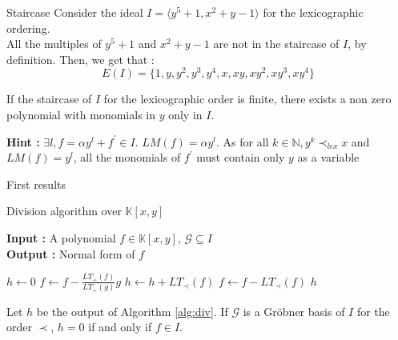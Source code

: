 \documentclass{beamer}
\begin{document}
\begin{frame}{Staircase}
    Consider the ideal $I = \langle y^{5} + 1, x^2 + y - 1 \rangle$ for the lexicographic ordering. \\
    All the multiples of $y^{5} + 1$ and $x^2 + y - 1$ are not in the staircase of $I$, by definition. 
    Then, we get that : 
    \begin{displaymath}
        E(I) = \{ 1, y, y^{2}, y^{3}, y^{4}, x, xy, xy^{2}, xy^{3}, xy^{4} \}
    \end{displaymath}
    \begin{theorem} \label{th:polynomial-only-in-y}
        If the staircase of $I$ for the lexicographic order is finite, there exists a non zero polynomial with monomials in $y$ only in $I$.
    \end{theorem}

    \textbf{Hint :} $\exists l, f = \alpha y^{l} + f^{\prime} \in I$. $LM(f) = \alpha y^{l}$. As for all $k \in \mathbb{N}, y^{k} \prec_{lex} x$ and $LM(f) = y^{l}$, all the monomials of $f^{\prime}$ must contain only $y$ as a variable
\end{frame}

\begin{frame}[shrink=20]{First results}
    \begin{algorithm}[H]
        \caption{Division algorithm over $\mathbb{K}[x, y]$} \label{alg:div}
        \textbf{Input : }A polynomial $f \in \mathbb{K}[x, y]$, $\mathscr{G} \subseteq I$ \\
        \textbf{Output : }Normal form of $f$
        \begin{algorithmic}
            \State $h \gets 0$
                    \State $f \gets f- \displaystyle \frac{LT_{\prec}(f)}{LT_{\prec}(g)}g$
                \Else
                    \State $h \gets h + LT_{\prec}(f)$
                    \State $f \gets f - LT_{\prec}(f)$
                \EndIf
            \EndWhile
            \State \Return $h$
        \end{algorithmic}
        \end{algorithm}
    \begin{theorem} \label{th:ideal-membership-test}
        Let $h$ be the output of Algorithm \ref{alg:div}. If $\mathscr{G}$ is a Gröbner basis of $I$ for the order $\prec$, $h = 0$ if and only if $f \in I$.
    \end{theorem}
\end{frame}
\end{document}
